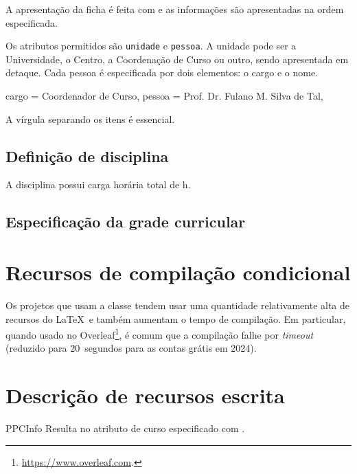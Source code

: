 \documentclass[a4paper, 11pt]{article}
\begin{document}
A apresentação da ficha é feita com  e as informações são apresentadas na ordem especificada.

Os atributos permitidos são \texttt{unidade} e \texttt{pessoa}. A unidade pode ser a Universidade, o Centro, a Coordenação de Curso ou outro, sendo apresentada em detaque. Cada pessoa é especificada por dois elementos: o cargo e o nome.

\begin{PDListing}
    cargo = {Coordenador de Curso},
    pessoa = {Prof. Dr. Fulano M. Silva de Tal},
\end{PDListing}

A vírgula separando os itens é essencial.

\subsection{Definição de disciplina}

\begin{PDExample}
    A disciplina  possui carga horária total de h.
\end{PDExample}

\subsection{Especificação da grade curricular}


\section{Recursos de compilação condicional}
%
%
Os projetos que usam a classe  tendem usar uma quantidade relativamente alta de recursos do \LaTeX\ e também aumentam o tempo de compilação. Em particular, quando usado no Overleaf\footnote{\url{https://www.overleaf.com}.}, é comum que a compilação falhe por \textit{timeout} (reduzido para 20~segundos para as contas grátis em 2024).


\section{Descrição de recursos escrita}

\begin{Macrodef}{PPCInfo}{}{}
    Resulta no atributo de curso especificado com .
\end{Macrodef}
\end{document}

